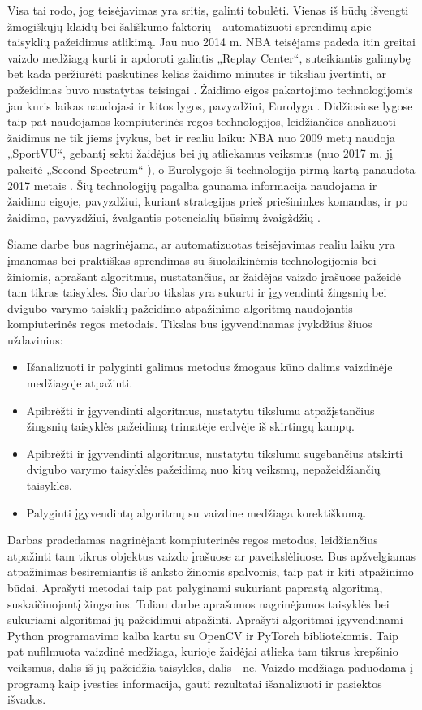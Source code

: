 \documentclass{VUMIFPSbakalaurinis}
\begin{document}
Visa tai rodo, jog teisėjavimas yra sritis, galinti tobulėti. Vienas iš būdų išvengti žmogiškųjų klaidų bei šališkumo faktorių - automatizuoti sprendimų apie taisyklių pažeidimus atlikimą. Jau nuo 2014 m. NBA teisėjams padeda itin greitai vaizdo medžiagą kurti ir apdoroti galintis „Replay Center“, suteikiantis galimybę bet kada peržiūrėti paskutines kelias žaidimo minutes ir tiksliau įvertinti, ar pažeidimas buvo nustatytas teisingai \cite{NBAReplay}. Žaidimo eigos pakartojimo technologijomis jau kuris laikas naudojasi ir kitos lygos, pavyzdžiui, Eurolyga \cite{EuroleagueReplay}.
Didžiosiose lygose taip pat naudojamos kompiuterinės regos technologijos, leidžiančios analizuoti žaidimus ne tik jiems įvykus, bet ir realiu laiku: NBA nuo 2009 metų naudoja „SportVU“, gebantį sekti žaidėjus bei jų atliekamus veiksmus \cite{NBAStatsVu} (nuo 2017 m. jį pakeitė „Second Spectrum“ \cite{SecondSpectrum}), o Eurolygoje ši technologija pirmą kartą panaudota 2017 metais \cite{EuroleagueStats}. Šių technologijų pagalba gaunama informacija naudojama ir žaidimo eigoje, pavyzdžiui, kuriant strategijas prieš priešininkes komandas, ir po žaidimo, pavyzdžiui, žvalgantis potencialių būsimų žvaigždžių \cite{THOMAS20173}.

Šiame darbe bus nagrinėjama, ar automatizuotas teisėjavimas realiu laiku yra įmanomas bei praktiškas sprendimas su šiuolaikinėmis technologijomis bei žiniomis, aprašant algoritmus, nustatančius, ar žaidėjas vaizdo įrašuose pažeidė tam tikras taisykles. Šio darbo tikslas yra sukurti ir įgyvendinti žingsnių bei dvigubo varymo taisklių pažeidimo atpažinimo algoritmą naudojantis kompiuterinės regos metodais. Tikslas bus įgyvendinamas įvykdžius šiuos uždavinius:

\begin{itemize}
	\item Išanalizuoti ir palyginti galimus metodus žmogaus kūno dalims vaizdinėje medžiagoje atpažinti.
	\item Apibrėžti ir įgyvendinti algoritmus, nustatytu tikslumu atpažįstančius žingsnių taisyklės pažeidimą
	trimatėje erdvėje iš skirtingų kampų.
	\item Apibrėžti ir įgyvendinti algoritmus, nustatytu tikslumu sugebančius atskirti dvigubo varymo
	taisyklės pažeidimą nuo kitų veiksmų, nepažeidžiančių taisyklės.
	\item Palyginti įgyvendintų algoritmų su vaizdine medžiaga korektiškumą.
\end{itemize}

Darbas pradedamas nagrinėjant kompiuterinės regos metodus, leidžiančius atpažinti tam tikrus objektus vaizdo įrašuose ar paveikslėliuose. Bus apžvelgiamas atpažinimas besiremiantis iš anksto žinomis spalvomis, taip pat ir kiti atpažinimo būdai. Aprašyti metodai taip pat palyginami sukuriant paprastą algoritmą, suskaičiuojantį žingsnius. Toliau darbe aprašomos nagrinėjamos taisyklės bei sukuriami algoritmai jų pažeidimui atpažinti. Aprašyti algoritmai įgyvendinami Python programavimo kalba kartu su OpenCV ir PyTorch bibliotekomis. Taip pat nufilmuota vaizdinė medžiaga, kurioje žaidėjai atlieka tam tikrus krepšinio veiksmus, dalis iš jų pažeidžia taisykles, dalis - ne. Vaizdo medžiaga paduodama į programą kaip įvesties informacija, gauti rezultatai išanalizuoti ir pasiektos išvados.
\end{document}
